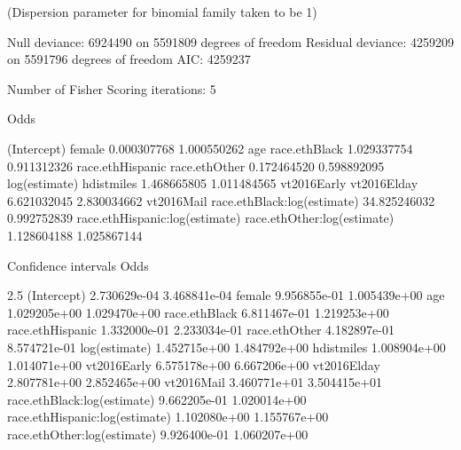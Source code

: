 (Dispersion parameter for binomial family taken to be 1)

    Null deviance: 6924490  on 5591809  degrees of freedom
Residual deviance: 4259209  on 5591796  degrees of freedom
AIC: 4259237

Number of Fisher Scoring iterations: 5


Odds

(Intercept)                         female
0.000307768                    1.000550262
        age                  race.ethBlack
1.029337754                    0.911312326
race.ethHispanic                  race.ethOther
0.172464520                    0.598892095
log(estimate)                     hdistmiles
1.468665805                    1.011484565
vt2016Early                    vt2016Elday
6.621032045                    2.830034662
 vt2016Mail    race.ethBlack:log(estimate)
34.825246032                    0.992752839
race.ethHispanic:log(estimate)    race.ethOther:log(estimate)
1.128604188                    1.025867144



Confidence intervals Odds

2.5 %
(Intercept)                    2.730629e-04 3.468841e-04
female                         9.956855e-01 1.005439e+00
age                            1.029205e+00 1.029470e+00
race.ethBlack                  6.811467e-01 1.219253e+00
race.ethHispanic               1.332000e-01 2.233034e-01
race.ethOther                  4.182897e-01 8.574721e-01
log(estimate)                  1.452715e+00 1.484792e+00
hdistmiles                     1.008904e+00 1.014071e+00
vt2016Early                    6.575178e+00 6.667206e+00
vt2016Elday                    2.807781e+00 2.852465e+00
vt2016Mail                     3.460771e+01 3.504415e+01
race.ethBlack:log(estimate)    9.662205e-01 1.020014e+00
race.ethHispanic:log(estimate) 1.102080e+00 1.155767e+00
race.ethOther:log(estimate)    9.926400e-01 1.060207e+00
